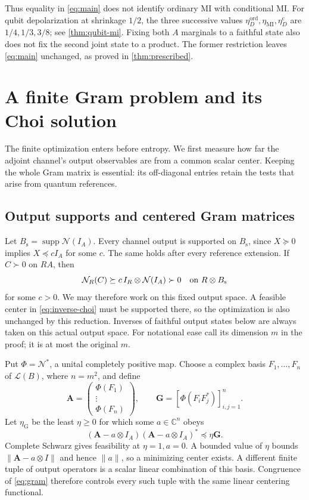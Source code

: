 \documentclass[11pt]{article}
\numberwithin{equation}{section}
\theoremstyle{definition}
\theoremstyle{remark}
\DeclareMathOperator{\supp}{supp}
\newcommand{\N}{\mathcal N}
\newcommand{\norm}[1]{\lVert #1\rVert}
\newcommand{\etaC}{\eta_D^{\mathrm c}}
\newcommand{\etaMI}{\eta_{\mathrm{MI}}}
\newcommand{\etaOrd}{\eta_D^{\mathrm{ord}}}
\begin{document}
Thus equality in \eqref{eq:main} does not identify ordinary MI with conditional
MI. For qubit depolarization at shrinkage $1/2$, the three successive values
$\etaOrd,\etaMI,\etaC$ are $1/4,1/3,3/8$; see \cref{thm:qubit-mi}.
Fixing both $A$ marginals to a faithful state also does not fix the second
joint state to a product. The former restriction leaves \eqref{eq:main}
unchanged, as proved in \cref{thm:prescribed}.

\section{A finite Gram problem and its Choi solution}
\label{sec:gram}

The finite optimization enters before entropy. We first measure how far the
adjoint channel's output observables are from a common scalar center. Keeping
the whole Gram matrix is essential: its off-diagonal entries retain the tests
that arise from quantum references.

\subsection{Output supports and centered Gram matrices}

Let $B_{\mathrm s}=\supp\N(I_A)$. Every channel output is supported on
$B_{\mathrm s}$, since $X\succeq0$ implies $X\preceq cI_A$ for some $c$.
The same holds after every reference extension. If $C\succ0$ on $RA$, then
\[
 \N_R(C)\succeq c\,I_R\otimes\N(I_A)\succ0
 \quad\hbox{on }R\otimes B_{\mathrm s}
\]
for some $c>0$. We may therefore work on this fixed output space. A feasible
center in \eqref{eq:inverse-choi} must be supported there, so the optimization
is also unchanged by this reduction. Inverses of faithful output states below
are always taken on this actual output space. For notational ease call its
dimension $m$ in the proof; it is at most the original $m$.

Put $\Phi=\N^*$, a unital completely positive map. Choose a complex basis
$F_1,\ldots,F_n$ of $\mathcal L(B)$, where $n=m^2$, and define
\[
 \mathbf A=\begin{pmatrix}\Phi(F_1)\\ \vdots\\ \Phi(F_n)\end{pmatrix},
 \qquad \mathbf G=[\Phi(F_iF_j^*)]_{i,j=1}^n .
\]
Let $\eta_{\mathrm G}$ be the least $\eta\geq0$ for which some
$a\in\mathbb C^n$ obeys
\begin{equation}
 (\mathbf A-a\otimes I_A)(\mathbf A-a\otimes I_A)^*
 \preceq\eta\mathbf G .
 \label{eq:gram}
\end{equation}
Complete Schwarz gives feasibility at $\eta=1,a=0$. A bounded value of $\eta$
bounds $\norm{\mathbf A-a\otimes I}$ and hence $\norm a$, so a minimizing
center exists. A different finite tuple of output operators is a scalar
linear combination of this basis. Congruence of \eqref{eq:gram} therefore
controls every such tuple with the same linear centering functional.
\end{document}
